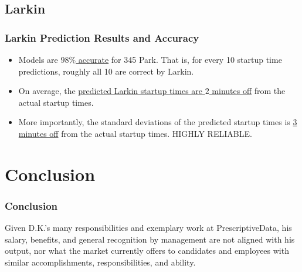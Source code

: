 \documentclass{beamer}
\begin{document}
\subsection{Larkin}
\begin{frame}
\frametitle{Larkin Prediction Results and Accuracy}
\begin{itemize}
	\item Models are \underline{$98\%$ accurate} for 345 Park. That is, for every 10 startup time predictions, roughly all 10 are correct by Larkin.
	\item On average, the \underline{predicted Larkin startup times are $2$ minutes off} from the actual startup times.
\item More importantly, the standard deviations of the predicted startup times is 
	\underline{3 minutes off} from the actual startup times. HIGHLY RELIABLE.
\end{itemize}
\end{frame}

\section{Conclusion}
\begin{frame}
	\frametitle{Conclusion}
Given D.K.'s many responsibilities and exemplary work at PrescriptiveData, his salary, benefits, and general recognition by management are not aligned with his output, nor what the market currently offers to candidates and employees with similar accomplishments, responsibilities, and ability.
\end{frame}
\end{document}
